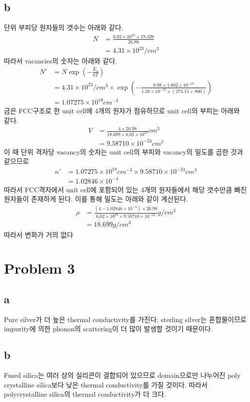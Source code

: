 \documentclass[a4paper]{oblivoir}
\begin{document}
\subsection{b}
단위 부피당 원자들의 갯수는 아래와 같다.
\begin{align}
	N &= \frac{6.02\times10^{23}\times 19.320}{26.98}\\
	&= 4.31\times 10^{23}/cm^{3}
\end{align}
따라서 vacancies의 숫자는 아래와 같다.
\begin{align}
	N' &= N \exp(-\frac{E_{v}}{kT})\\
	&= 4.31\times 10^{23}/cm^{3} \times \exp(-\frac{0.98 \times 1.602\times 10^{-19}}{1.38\times 10^{-23} \times (273.15 + 800)})\\
	&= 1.07275 \times 10^{19}cm^{-3}
\end{align}
금은 FCC구조로 한 unit cell에 4개의 원자가 점유하므로 unit cell의 부피는 아래와 같다.
\begin{align}
	V &= \frac{4\times 26.98}{18.699\times 6.02 \times 10^{23}}cm^{3}\\
	&= 9.58710\times 10^{-24}cm^{3}
\end{align}
이 때 단위 격자당 vacancy의 숫자는 unit cell의 부피와 vacancy의 밀도를 곱한 것과 같으므로
\begin{align}
	n' &= 1.07275 \times 10^{19}cm^{-3} \times 9.58710\times 10^{-24}cm^{3}\\
	&= 1.02846\times 10^{-4}
\end{align}
따라서 FCC격자에서 unit cell에 포함되어 있는 4개의 원자들에서 해당 갯수만큼 빠진 원자들이 존재하게 된다. 이를 통해 밀도는 아래와 같이 계산된다.
\begin{align}
	\rho &= \frac{(4- 1.02846\times 10^{-4}) \times 26.98}{6.02 \times 10^{23} \times 9.58710\times 10^{-24}} g / cm^{3}\\
	&= 18.699g / cm^{3}
\end{align}
따라서 변화가 거의 없다

\section{Problem 3}
\subsection{a}
Pure silver가 더 높은 thermal conductivity를 가진다. sterling silver는 혼합물이므로 impurity에 의한 phonon의 scattering이 더 많이 발생할 것이기 때문이다.

\subsection{b}
Fused silica는 여러 상의 실리콘이 결합되어 있으므로 domain으로만 나누어진 poly crystalline silica보다 낮은 thermal conductivity를 가질 것이다. 따라서 polycrystalline silica의 thermal conductivity가 더 크다.
\end{document}

